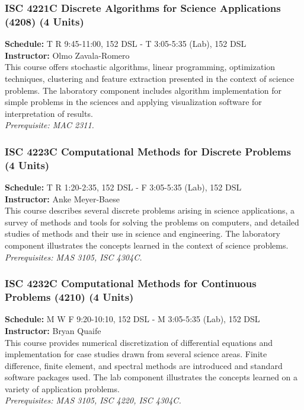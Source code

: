 \documentclass[12pt,a4paper]{article}
\begin{document}
\subsubsection*{ISC 4221C Discrete Algorithms for Science Applications (4208) (4 Units)}
\textbf{Schedule:} T R 9:45-11:00, 152 DSL - T 3:05-5:35 (Lab), 152 DSL \\
\textbf{Instructor:} Olmo Zavala-Romero \\
This course offers stochastic algorithms, linear programming, optimization techniques, clustering and feature extraction presented in the context of science problems. The laboratory component includes algorithm implementation for simple problems in the sciences and applying visualization software for interpretation of results. \\
\textit{Prerequisite: MAC 2311.}

\subsubsection*{ISC 4223C Computational Methods for Discrete Problems (4 Units)}
\textbf{Schedule:} T R 1:20-2:35, 152 DSL - F 3:05-5:35 (Lab), 152 DSL \\
\textbf{Instructor:} Anke Meyer-Baese \\
This course describes several discrete problems arising in science applications, a survey of methods and tools for solving the problems on computers, and detailed studies of methods and their use in science and engineering. The laboratory component illustrates the concepts learned in the context of science problems. \\
\textit{Prerequisites: MAS 3105, ISC 4304C.}

\subsubsection*{ISC 4232C Computational Methods for Continuous Problems (4210) (4 Units)}
\textbf{Schedule:} M W F 9:20-10:10, 152 DSL - M 3:05-5:35 (Lab), 152 DSL \\
\textbf{Instructor:} Bryan Quaife \\
This course provides numerical discretization of differential equations and implementation for case studies drawn from several science areas. Finite difference, finite element, and spectral methods are introduced and standard software packages used. The lab component illustrates the concepts learned on a variety of application problems. \\
\textit{Prerequisites: MAS 3105, ISC 4220, ISC 4304C.}
\end{document}
